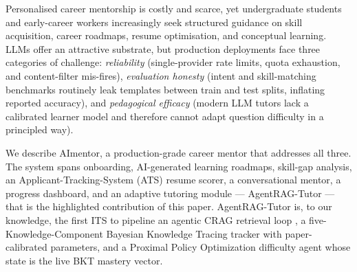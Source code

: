 \documentclass[conference]{IEEEtran}
\begin{document}
Personalised career mentorship is costly and scarce, yet undergraduate
students and early-career workers increasingly seek structured
guidance on skill acquisition, career roadmaps, resume optimisation,
and conceptual learning. LLMs offer an attractive substrate, but
production deployments face three categories of challenge:
\emph{reliability} (single-provider rate limits, quota exhaustion,
and content-filter mis-fires), \emph{evaluation honesty} (intent and
skill-matching benchmarks routinely leak templates between train and
test splits, inflating reported accuracy), and \emph{pedagogical
efficacy} (modern LLM tutors lack a calibrated learner model and
therefore cannot adapt question difficulty in a principled way).

We describe AImentor, a production-grade career mentor that addresses
all three. The system spans onboarding, AI-generated learning
roadmaps, skill-gap analysis, an Applicant-Tracking-System (ATS)
resume scorer, a conversational mentor, a progress dashboard, and an
adaptive tutoring module --- AgentRAG-Tutor --- that is the
highlighted contribution of this paper. AgentRAG-Tutor is, to our
knowledge, the first ITS to pipeline an agentic CRAG retrieval loop
\cite{yan2024crag}, a five-Knowledge-Component Bayesian Knowledge
Tracing tracker \cite{corbett1994bkt} with paper-calibrated
parameters, and a Proximal Policy Optimization difficulty agent
\cite{schulman2017ppo} whose state is the live BKT mastery vector.
\end{document}
